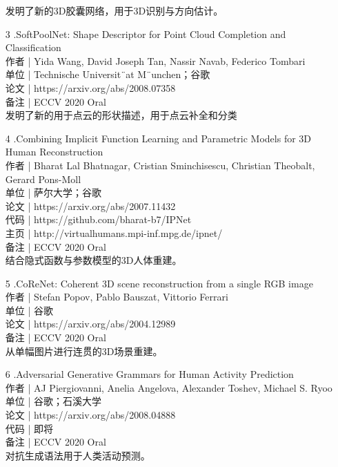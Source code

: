 \documentclass{article}
\begin{document}
\begin{itemize}
	   	发明了新的3D胶囊网络，用于3D识别与方向估计。
	   	
	   	\item 
	   	[3].SoftPoolNet: Shape Descriptor for Point Cloud Completion and Classification\\
	   	作者 | Yida Wang, David Joseph Tan, Nassir Navab, Federico Tombari\\
	   	单位 | Technische Universit¨at M¨unchen；谷歌\\
	   	论文 | https://arxiv.org/abs/2008.07358\\
	   	备注 | ECCV 2020 Oral \\
	   	
	   	发明了新的用于点云的形状描述，用于点云补全和分类\\
	   	
	   	\item 
	   	[4].Combining Implicit Function Learning and Parametric Models for 3D Human Reconstruction\\
	   	作者 | Bharat Lal Bhatnagar, Cristian Sminchisescu, Christian Theobalt, Gerard Pons-Moll\\
	   	单位 | 萨尔大学；谷歌\\
	   	论文 | https://arxiv.org/abs/2007.11432\\
	   	代码 | https://github.com/bharat-b7/IPNet\\
	   	主页 | http://virtualhumans.mpi-inf.mpg.de/ipnet/\\
	   	备注 | ECCV 2020 Oral \\
	   	
	   	结合隐式函数与参数模型的3D人体重建。\\
	   	
	   	\item 
	   	[5].CoReNet: Coherent 3D scene reconstruction from a single RGB image\\
	   	作者 | Stefan Popov, Pablo Bauszat, Vittorio Ferrari\\
	   	单位 | 谷歌\\
	   	论文 | https://arxiv.org/abs/2004.12989\\
	   	备注 | ECCV 2020 Oral \\
	   	从单幅图片进行连贯的3D场景重建。\\
	   	
	   	\item 
	   	[6].Adversarial Generative Grammars for Human Activity Prediction\\
	   	作者 | AJ Piergiovanni, Anelia Angelova, Alexander Toshev, Michael S. Ryoo\\
	   	单位 | 谷歌；石溪大学\\
	   	论文 | https://arxiv.org/abs/2008.04888\\
	   	代码 | 即将\\
	   	备注 | ECCV 2020 Oral \\
	   	对抗生成语法用于人类活动预测。\\
	   	

\end{itemize}
\end{document}
